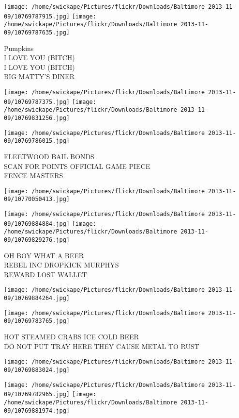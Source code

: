 \documentclass[10pt,letterpaper]{article}
\begin{document}
\texttt{[image: /home/swickape/Pictures/flickr/Downloads/Baltimore 2013-11-09/10769787915.jpg]}
\texttt{[image: /home/swickape/Pictures/flickr/Downloads/Baltimore 2013-11-09/10769787635.jpg]}

Pumpkins\\
I LOVE YOU (BITCH)\\
I LOVE YOU (BITCH)\\
BIG MATTY'S DINER
\pagebreak

\texttt{[image: /home/swickape/Pictures/flickr/Downloads/Baltimore 2013-11-09/10769787375.jpg]}
\texttt{[image: /home/swickape/Pictures/flickr/Downloads/Baltimore 2013-11-09/10769831256.jpg]}

\vspace{0.25in}
\texttt{[image: /home/swickape/Pictures/flickr/Downloads/Baltimore 2013-11-09/10769786015.jpg]}

FLEETWOOD BAIL BONDS\\
SCAN FOR POINTS OFFICIAL GAME PIECE\\
FENCE MASTERS
\pagebreak

\texttt{[image: /home/swickape/Pictures/flickr/Downloads/Baltimore 2013-11-09/10770050413.jpg]}

\vspace{0.25in}
\texttt{[image: /home/swickape/Pictures/flickr/Downloads/Baltimore 2013-11-09/10769884884.jpg]}
\texttt{[image: /home/swickape/Pictures/flickr/Downloads/Baltimore 2013-11-09/10769829276.jpg]}

OH BOY WHAT A BEER\\
REBEL INC DROPKICK MURPHYS\\
REWARD LOST WALLET
\pagebreak

\texttt{[image: /home/swickape/Pictures/flickr/Downloads/Baltimore 2013-11-09/10769884264.jpg]}

\vspace{0.25in}
\texttt{[image: /home/swickape/Pictures/flickr/Downloads/Baltimore 2013-11-09/10769783765.jpg]}

HOT STEAMED CRABS ICE COLD BEER\\
DO NOT PUT TRAY HERE THEY CAUSE METAL TO RUST
\pagebreak

\texttt{[image: /home/swickape/Pictures/flickr/Downloads/Baltimore 2013-11-09/10769883024.jpg]}

\vspace{0.25in}
\texttt{[image: /home/swickape/Pictures/flickr/Downloads/Baltimore 2013-11-09/10769782965.jpg]}
\texttt{[image: /home/swickape/Pictures/flickr/Downloads/Baltimore 2013-11-09/10769881974.jpg]}
\end{document}
